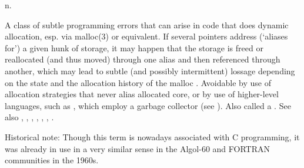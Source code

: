  n.

A class of subtle programming errors that can arise in code that does dynamic allocation, esp. via malloc(3) or equivalent. If several
pointers address (`aliases for') a given hunk of storage, it may happen that the storage is freed or reallocated (and thus moved) through
one alias and then referenced through another, which may lead to subtle (and possibly intermittent) lossage depending on the state and the
allocation history of the malloc . Avoidable by use of allocation strategies that never alias allocated core, or by use of
higher-level languages, such as , which employ a garbage collector (see ). Also called a . See also , , , ,
, , .

Historical note: Though this term is nowadays associated with C programming, it was already in use in a very similar sense in the Algol-60
and FORTRAN communities in the 1960s.

